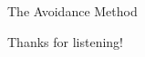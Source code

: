 \documentclass[usenames,dvipsnames,handout]{beamer}
\begin{document}
\begin{frame}
    The Avoidance Method
\end{frame}

















\begin{frame}

\begin{center}
    \huge Thanks for listening!
\end{center}

\end{frame}
\end{document}
